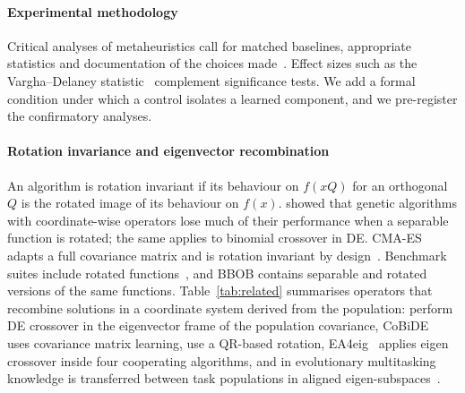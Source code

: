 \paragraph{Experimental methodology} Critical analyses of metaheuristics call for matched baselines, appropriate
statistics and documentation of the choices made~\citep{derrac2011tutorial,demsar2006}. Effect sizes such as the
Vargha--Delaney statistic~\citep{vargha2000} complement significance tests. We add a formal condition under which a control
isolates a learned component, and we pre-register the confirmatory analyses.

\paragraph{Rotation invariance and eigenvector recombination} An algorithm is rotation invariant if its behaviour on
$f(xQ)$ for an orthogonal $Q$ is the rotated image of its behaviour on $f(x)$. \citet{salomon1996rotation} showed that
genetic algorithms with coordinate-wise operators lose much of their performance when a separable function is rotated;
the same applies to binomial crossover in DE. CMA-ES adapts a full covariance matrix and is rotation invariant by
design~\citep{hansen2001cma}. Benchmark suites include rotated functions~\citep{hansen2009bbob,hansen2021coco,
kumar2021cec2022}, and BBOB contains separable and rotated versions of the same functions. Table~\ref{tab:related}
summarises operators that recombine solutions in a coordinate system derived from the population:
\citet{guo2015eigen} perform DE crossover in the eigenvector frame of the population covariance, CoBiDE~\citep{wang2014cobide}
uses covariance matrix learning, \citet{civicioglu2018aplus} use a QR-based rotation, EA4eig~\citep{bujok2022ea4eig}
applies eigen crossover inside four cooperating algorithms, and in evolutionary multitasking knowledge is transferred
between task populations in aligned eigen-subspaces~\citep{tang2021regularized,tang2022adaptive}.

